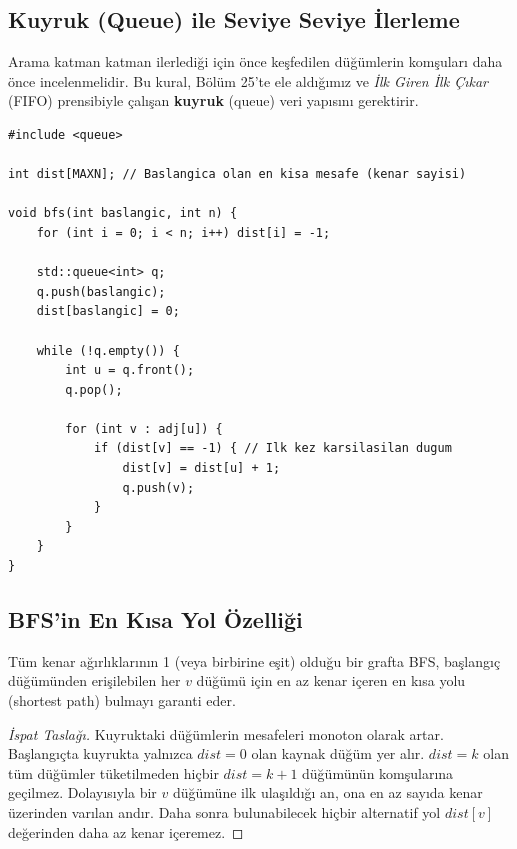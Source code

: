 \subsection{Kuyruk (Queue) ile Seviye Seviye İlerleme}
Arama katman katman ilerlediği için önce keşfedilen düğümlerin komşuları daha önce incelenmelidir. Bu kural, Bölüm 25'te ele aldığımız ve \emph{İlk Giren İlk Çıkar} (FIFO) prensibiyle çalışan \textbf{kuyruk} (queue) veri yapısını gerektirir.

\begin{lstlisting}[language=CTemel]
#include <queue>

int dist[MAXN]; // Baslangica olan en kisa mesafe (kenar sayisi)

void bfs(int baslangic, int n) {
    for (int i = 0; i < n; i++) dist[i] = -1;
    
    std::queue<int> q;
    q.push(baslangic);
    dist[baslangic] = 0;
    
    while (!q.empty()) {
        int u = q.front();
        q.pop();
        
        for (int v : adj[u]) {
            if (dist[v] == -1) { // Ilk kez karsilasilan dugum
                dist[v] = dist[u] + 1;
                q.push(v);
            }
        }
    }
}
\end{lstlisting}

\subsection{BFS'in En Kısa Yol Özelliği}
\begin{theorem}
Tüm kenar ağırlıklarının 1 (veya birbirine eşit) olduğu bir grafta BFS, başlangıç düğümünden erişilebilen her $v$ düğümü için en az kenar içeren en kısa yolu (shortest path) bulmayı garanti eder.
\end{theorem}
\begin{proof}[İspat Taslağı]
Kuyruktaki düğümlerin mesafeleri monoton olarak artar. Başlangıçta kuyrukta yalnızca $dist=0$ olan kaynak düğüm yer alır. $dist=k$ olan tüm düğümler tüketilmeden hiçbir $dist=k+1$ düğümünün komşularına geçilmez. Dolayısıyla bir $v$ düğümüne ilk ulaşıldığı an, ona en az sayıda kenar üzerinden varılan andır. Daha sonra bulunabilecek hiçbir alternatif yol $dist[v]$ değerinden daha az kenar içeremez.
\end{proof}

